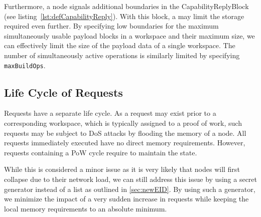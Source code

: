 Furthermore, a node signals additional boundaries in the CapabilityReplyBlock (see listing~\ref{lst:defCapabilityReply}). With this block, a \VortexNode{} may limit the storage required even further. By specifying low boundaries for the maximum simultaneously usable payload blocks in a workspace and their maximum size, we can effectively limit the size of the payload data of a single workspace. The number of simultaneously active operations is similarly limited by specifying \texttt{maxBuildOps}.

\subsection{Life Cycle of Requests}
Requests have a separate life cycle. As a request may exist prior to a corresponding workspace, which is typically assigned to a proof of work, such requests may be subject to DoS attacks by flooding the memory of a node. All requests immediately executed have no direct memory requirements. However, requests containing a PoW cycle require to maintain the state. 

While this is considered a minor issue as it is very likely that nodes will first collapse due to their network load, we can still address this issue by using a secret generator instead of a list as outlined in \cref{sec:newEID}. By using such a generator, we minimize the impact of a very sudden increase in requests while keeping the local memory requirements to an absolute minimum. 


